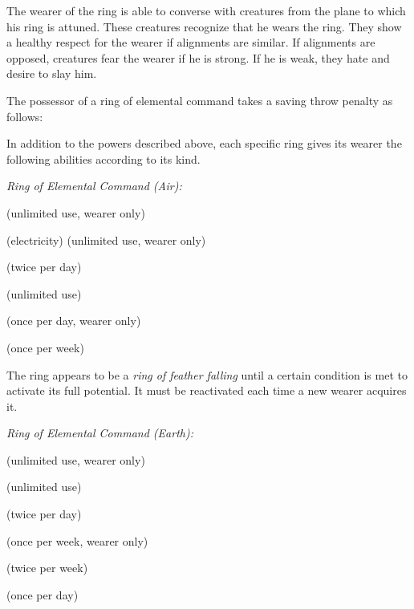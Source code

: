 The wearer of the ring is able to converse with creatures from the plane to which his ring is attuned. These creatures recognize that he wears the ring. They show a healthy respect for the wearer if alignments are similar. If alignments are opposed, creatures fear the wearer if he is strong. If he is weak, they hate and desire to slay him.

The possessor of a ring of elemental command takes a saving throw penalty as follows:


In addition to the powers described above, each specific ring gives its wearer the following abilities according to its kind.

\textit{Ring of Elemental Command (Air):}
\begin{itemize*}
\item {} (unlimited use, wearer only)
\item {} (electricity) (unlimited use, wearer only)
\item {} (twice per day)
\item {} (unlimited use)
\item {} (once per day, wearer only)
\item {} (once per week)
\end{itemize*}

The ring appears to be a \emph{ring of feather falling} until a certain condition is met to activate its full potential. It must be reactivated each time a new wearer acquires it.

\textit{Ring of Elemental Command (Earth):}
\begin{itemize*}
\item {} (unlimited use, wearer only)
\item {} (unlimited use)
\item {} (twice per day)
\item {} (once per week, wearer only)
\item {} (twice per week)
\item {} (once per day)
\end{itemize*}

